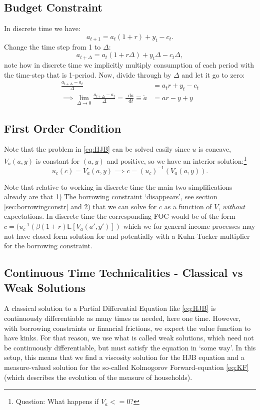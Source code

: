 \documentclass[12pt]{article}
\newcommand{\E}{\mathbb{E}}
\DeclareMathOperator{\1}{\mathbbm{1}}
\newcommand*\diff{\mathop{}\!\mathrm{d}}
\begin{document}
\subsection{Budget Constraint\label{sec:derbc}}
In discrete time we have:
\begin{equation*}
a_{t+1} = a_t(1+r) + y_t - c_t.
\end{equation*}
Change the time step from 1 to $\Delta$: 
\begin{equation*}
a_{t+\Delta} = a_t(1+r\Delta) + y_t\Delta - c_t\Delta,
\end{equation*}
note how in discrete time we implicitly multiply consumption of each period with the time-step that is 1-period. Now, divide through by $\Delta$ and let it go to zero:
\begin{align*}
\frac{a_{t+\Delta}-a_t}{\Delta} &= a_tr+ y_t- c_t \\
\implies \lim_{\Delta\to 0} \frac{a_{t+\Delta}-a_t}{\Delta} = \frac{\diff a}{\diff t} \equiv \dot a &= ar - y +y
\end{align*}


\subsection{First Order Condition}
Note that the problem in \eqref{eq:HJB} can be solved easily since $u$ is concave, $V_a(a,y)$ is constant for $(a,y)$ and positive, so we have an interior solution:\footnote{Question: What happens if $V_a<=0$?}
\begin{equation}
u_c(c)=V_a(a,y) \implies c=(u_c)^{-1} \left( V_a(a,y) \right ).
\end{equation}

Note that relative to working in discrete time the main two simplifications already are that 1) The borrowing constraint `disappears', see section \ref{sec:borrowingconstr} and 2) that we can solve for $c$ as a function of $V$, \textit{without} expectations. In discrete time the corresponding FOC would be of the form $c=(u_c^{-1}\left(\beta(1+r)\E [V_a(a',y')]\right)$ which we for general income processes may not have closed form solution for and potentially with a Kuhn-Tucker multiplier for the borrowing constraint.

\subsection{Continuous Time Technicalities - Classical vs Weak Solutions}
\label{sec:contdetails}
A classical solution to a Partial Differential Equation like \eqref{eq:HJB} is continuously differentiable as many times as needed, here one time. However, with borrowing constraints or financial frictions, we expect the value function to have kinks. For that reason, we use what is called weak solutions, which need not be continuously differentiable, but must satisfy the equation in `some way'. In this setup, this means that we find a viscosity solution for the HJB equation and a measure-valued solution for the so-called Kolmogorov Forward-equation \eqref{eq:KF} (which describes the evolution of the measure of households).
\end{document}
